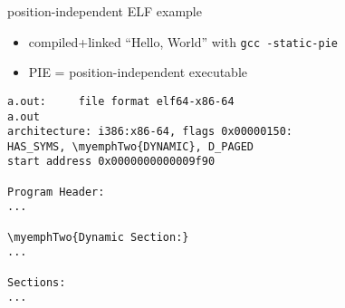 \providecommand{\myemphTwo}[1]{\myemph<2>{#1}}
\providecommand{\myemphTwoB}[1]{\myemph<2>{\textbf<2>{#1}}}
\providecommand{\myemphThree}[1]{\myemph<3>{#1}}
\providecommand{\myemphFour}[1]{\myemph<4>{#1}}
\providecommand{\myemphFive}[1]{\myemph<5>{#1}}
\providecommand{\myemphSix}[1]{\myemph<6>{#1}}
\providecommand{\myemphSeven}[1]{\myemph<7>{#1}}

\begin{frame}[fragile,label=elfExOver1]{position-independent ELF example}
    \begin{itemize}
    \item compiled+linked ``Hello, World'' with {\tt gcc -static-pie}
    \item PIE = position-independent executable
    \end{itemize}
\begin{Verbatim}[commandchars=\\\{\},fontsize=\small]
a.out:     file format elf64-x86-64
a.out
architecture: i386:x86-64, flags 0x00000150:
HAS_SYMS, \myemphTwo{DYNAMIC}, D_PAGED
start address 0x0000000000009f90

Program Header:
...

\myemphTwo{Dynamic Section:}
...

Sections:
...
\end{Verbatim}
\end{frame}
